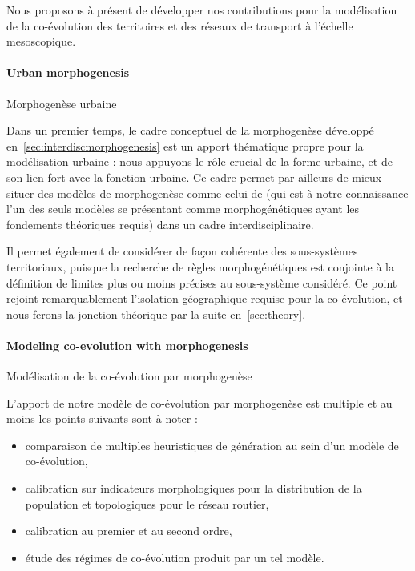 Nous proposons à présent de développer nos contributions pour la modélisation de la co-évolution des territoires et des réseaux de transport à l'échelle mesoscopique. 

\paragraph{Urban morphogenesis}{Morphogenèse urbaine}


Dans un premier temps, le cadre conceptuel de la morphogenèse développé en~\ref{sec:interdiscmorphogenesis} est un apport thématique propre pour la modélisation urbaine : nous appuyons le rôle crucial de la forme urbaine, et de son lien fort avec la fonction urbaine. Ce cadre permet par ailleurs de mieux situer des modèles de morphogenèse comme celui de \cite{bonin2014modelisation} (qui est à notre connaissance l'un des seuls modèles se présentant comme morphogénétiques ayant les fondements théoriques requis) dans un cadre interdisciplinaire.

Il permet également de considérer de façon cohérente des sous-systèmes territoriaux, puisque la recherche de règles morphogénétiques est conjointe à la définition de limites plus ou moins précises au sous-système considéré. Ce point rejoint remarquablement l'isolation géographique requise pour la co-évolution, et nous ferons la jonction théorique par la suite en~\ref{sec:theory}.


\paragraph{Modeling co-evolution with morphogenesis}{Modélisation de la co-évolution par morphogenèse}


L'apport de notre modèle de co-évolution par morphogenèse est multiple et au moins les points suivants sont à noter :
\begin{itemize}
	\item comparaison de multiples heuristiques de génération au sein d'un modèle de co-évolution,
	\item calibration sur indicateurs morphologiques pour la distribution de la population et topologiques pour le réseau routier,
	\item calibration au premier et au second ordre,
	\item étude des régimes de co-évolution produit par un tel modèle.
\end{itemize}

